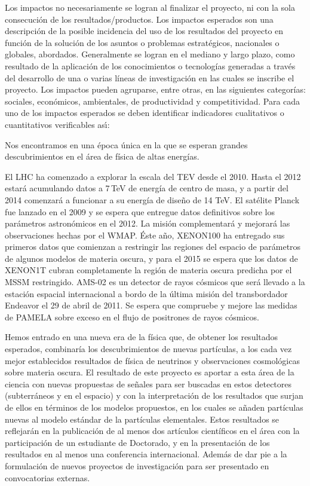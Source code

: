 \begin{instrucciones}
  Los impactos no necesariamente se logran al finalizar el proyecto, ni
con la sola consecución de los resultados/productos. Los impactos
esperados son una descripción de la posible incidencia del uso de los
resultados del proyecto en función de la solución de los asuntos o
problemas estratégicos, nacionales o globales, abordados. Generalmente
se logran en el mediano y largo plazo, como resultado de la aplicación
de los conocimientos o tecnologías generadas a través del desarrollo
de una o varias líneas de investigación en las cuales se inscribe el
proyecto. Los impactos pueden agruparse, entre otras, en las
siguientes categorías: sociales, económicos, ambientales, de
productividad y competitividad. Para cada uno de los impactos
esperados se deben identificar indicadores cualitativos o
cuantitativos verificables as\'\i:
\end{instrucciones}


Nos encontramos en una época única en la que se esperan grandes
descubrimientos en el área de física de altas energías.
\begin{soloproyecto}
El LHC ha
comenzado a explorar la escala del TEV desde el 2010. Hasta el 2012
estará acumulando datos a 7\,TeV de energía de centro de masa, y a
partir del 2014 comenzará a funcionar a su energía de diseño de 14
TeV. El satélite Planck fue lanzado en el 2009 y se espera que
entregue datos definitivos sobre los parámetros astronómicos en el
2012. La misión complementará y mejorará las observaciones hechas por
el WMAP. Éste año, XENON100 ha entregado sus primeros datos que
comienzan a restringir las regiones del espacio de parámetros de
algunos modelos de materia oscura, y para el 2015 se espera que los
datos de XENON1T cubran completamente la región de materia oscura
predicha por el MSSM restringido. AMS-02 es un detector de rayos
cósmicos que será llevado a la estación espacial internacional a bordo
de la última misión del transbordador Endeavor el 29 de abril de
2011. Se espera que compruebe y mejore las medidas de PAMELA sobre
exceso en el flujo de positrones de rayos cósmicos.  
\end{soloproyecto}
 Hemos entrado en
una nueva era de la física que, de obtener los resultados esperados,
combinaría los descubrimientos de nuevas partículas, a los cada vez
mejor establecidos resultados de física de neutrinos y observaciones
cosmológicas sobre materia oscura. El resultado de este proyecto es
aportar a esta área de la ciencia con nuevas propuestas de señales
para ser buscadas en estos detectores (subterráneos y en el espacio) y
con la interpretación de los resultados que surjan de ellos en
términos de los modelos propuestos, en los cuales se añaden partículas
nuevas al modelo estándar de la partículas elementales. Estos
resultados se reflejarán en la publicación de al menos dos artículos
científicos en el área con la participación de un estudiante de
Doctorado, y en la presentación de los resultados en al menos una
conferencia internacional. Además de dar pie a la formulación de
nuevos proyectos de investigación para ser presentado en convocatorias
externas.



